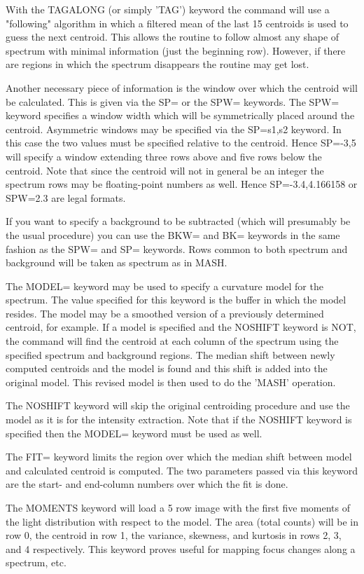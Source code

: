 With the TAGALONG (or simply 'TAG') keyword the command will use a
"following" algorithm in which a filtered mean of the last 15 centroids is
used to guess the next centroid.  This allows the routine to follow almost
any shape of spectrum with minimal information (just the beginning row).
However, if there are regions in which the spectrum disappears the routine
may get lost.

Another necessary piece of information is the window over which the
centroid will be calculated.  This is given via the SP= or the SPW=
keywords.  The SPW= keyword specifies a window width which will be
symmetrically placed around the centroid.  Asymmetric windows may be
specified via the SP=s1,s2 keyword.  In this case the two values must be
specified relative to the centroid.  Hence SP=-3,5 will specify a window
extending three rows above and five rows below the centroid.  Note that
since the centroid will not in general be an integer the spectrum rows may
be floating-point numbers as well.  Hence SP=-3.4,4.166158 or SPW=2.3 are
legal formats.

If you want to specify a background to be subtracted (which will presumably
be the usual procedure) you can use the BKW= and BK= keywords in the same
fashion as the SPW= and SP= keywords. Rows common to both spectrum and
background will be taken as spectrum as in MASH.

The MODEL= keyword may be used to specify a curvature model for the
spectrum.  The value specified for this keyword is the buffer in which the
model resides.  The model may be a smoothed version of a previously
determined centroid, for example. If a model is specified and the NOSHIFT
keyword is NOT, the command will find the centroid at each column of the
spectrum using the specified spectrum and background regions.  The median
shift between newly computed centroids and the model is found and this
shift is added into the original model.  This revised model is then used to
do the 'MASH' operation.

The NOSHIFT keyword will skip the original centroiding procedure and use
the model as it is for the intensity extraction. Note that if the NOSHIFT
keyword is specified then the MODEL= keyword must be used as well.

The FIT= keyword limits the region over which the median shift between
model and calculated centroid is computed.  The two parameters passed via
this keyword are the start- and end-column numbers over which the fit is
done.

The MOMENTS keyword will load a 5 row image with the first five moments of
the light distribution with respect to the model. The area (total counts)
will be in row 0, the centroid in row 1, the variance, skewness, and
kurtosis in rows 2, 3, and 4 respectively. This keyword proves useful for
mapping focus changes along a spectrum, etc.

